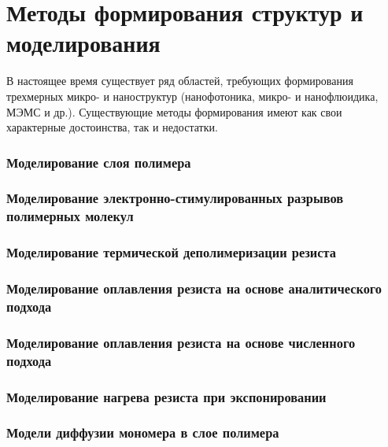 \chapter{Методы формирования структур и моделирования} \label{chapter:methods}

В настоящее время существует ряд областей, требующих формирования трехмерных микро- и наноструктур (нанофотоника, микро- и нанофлюидика, МЭМС и др.). Существующие методы формирования имеют как свои характерные достоинства, так и недостатки.

%
%
%










\subsection{Моделирование слоя полимера}

\subsection{Моделирование электронно-стимулированных разрывов полимерных молекул}

\subsection{Моделирование термической деполимеризации резиста}

\subsection{Моделирование оплавления резиста на основе аналитического подхода}

\subsection{Моделирование оплавления резиста на основе численного подхода}

\subsection{Моделирование нагрева резиста при экспонировании}

\subsection{Модели диффузии мономера в слое полимера}




